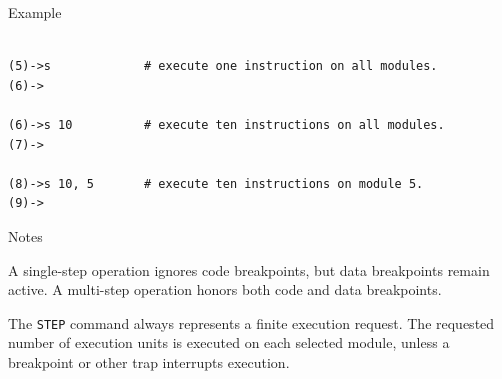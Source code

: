 \begin{iPageDescOpEntry}{Example}
\begin{lstlisting}[style=iPageOpStyle]

(5)->s             # execute one instruction on all modules.
(6)->

(6)->s 10          # execute ten instructions on all modules.
(7)->

(8)->s 10, 5       # execute ten instructions on module 5.
(9)->

\end{lstlisting}
\end{iPageDescOpEntry}

\begin{iPageDescEntry}{Notes}

A single-step operation ignores code breakpoints, but data breakpoints remain
active. A multi-step operation honors both code and data breakpoints.

The \texttt{STEP} command always represents a finite execution request. The
requested number of execution units is executed on each selected module,
unless a breakpoint or other trap interrupts execution.

\end{iPageDescEntry}
